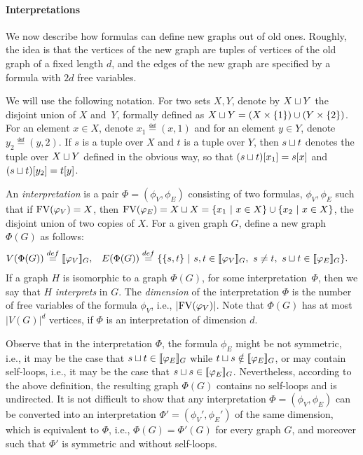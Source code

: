 \paragraph{Interpretations}
We now describe how formulas can define new graphs out of old ones. Roughly, the idea is that the vertices of the new graph are tuples of vertices of the old graph 
of a fixed length $d$,
and the edges of the new graph are specified by a formula with $2d$ free variables.

We will use the following notation.
For two sets $X,Y$, denote by $X\sqcup Y$
the disjoint union of $X$ and~$Y$, formally defined as $X\sqcup Y=(X\times\{1\})\cup (Y\times \{2\})$.
For an element $x\in X$, denote $x_1\eqdef (x,1)$ and for an element $y\in Y$, denote $y_2\eqdef(y,2)$.
 If $s$ is a tuple over $X$ and $t$ is a tuple over $Y$, then  $s\sqcup t$ denotes
the tuple over $X\sqcup Y$ defined in the obvious way, so that $(s\sqcup t)[x_1]=s[x]$
and $(s\sqcup t)[y_2]=t[y]$.


An \emph{interpretation} is a pair $\Phi=(\phi_V,\phi_E)$ consisting of two formulas,
$\phi_V,\phi_E$ such that if $\textrm{FV}(\varphi_V)=X$, then
$\textrm{FV}(\varphi_E)=X\sqcup X=\{x_1\ |\ x\in X\}\cup \{x_2\ |\ x\in X\}$, the disjoint union of two copies of $X$.
For a given graph $G$, define a new graph $\Phi(G)$ as follows:
\begin{align*}
V(\Phi(G))&\eqdef\sem {\phi_V}_G,&
E(\Phi(G))&\eqdef\setof{\set{s, t}}{s,t\in\sem{\phi_V}_G,\ s\neq t,\ s\disjoint t\in \sem{\phi_E}_G}.
\end{align*}
 If a graph $H$ is isomorphic to a graph $\Phi(G)$,
for some interpretation~$\Phi$, then we say that $H$ \emph{interprets} in $G$.
The \emph{dimension} of the interpretation $\Phi$
is the number of free variables of the formula $\phi_V$, i.e., $|\textrm{FV}(\varphi_V)|$. Note that $\Phi(G)$ has at most $|V(G)|^d$ vertices, if $\Phi$ is an interpretation of dimension $d$.

\begin{remark}
  Observe that in the interpretation $\Phi$,
  the formula $\phi_E$ might be not symmetric,
  i.e., it may be the case that $s\sqcup t\in[\![\varphi_E]\!]_G$ while $t\sqcup s\notin[\![\varphi_E]\!]_G$,
  or may contain self-loops, i.e., it may be the case that $s\sqcup s\in[\![\varphi_E]\!]_G$. Nevertheless, according to the above definition, the resulting graph $\Phi(G)$ contains no self-loops and is undirected.
  It is not difficult to show that any interpretation $\Phi=(\phi_V,\phi_E)$ can be converted into an interpretation $\Phi'=(\phi_V',\phi_E')$ of the same dimension, which is equivalent to $\Phi$, i.e., 
  $\Phi(G)=\Phi'(G)$ for every graph $G$, and moreover such that $\Phi'$ is symmetric and without self-loops.  
\end{remark}




